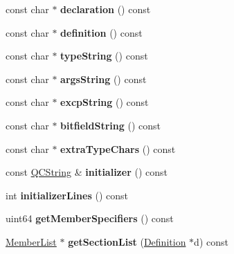 \begin{DoxyCompactItemize}
const char $\ast$ {\bfseries declaration} () const
\item 
\mbox{\label{class_member_def_a112a71f8c5af95c197988060eea13832}} 
const char $\ast$ {\bfseries definition} () const
\item 
\mbox{\label{class_member_def_a3bc37aed3d8749a64ad7007966baef89}} 
const char $\ast$ {\bfseries type\+String} () const
\item 
\mbox{\label{class_member_def_ab16c449b9240d21e79340053ed027887}} 
const char $\ast$ {\bfseries args\+String} () const
\item 
\mbox{\label{class_member_def_ae3722784cb64009073d1519d7168e0a1}} 
const char $\ast$ {\bfseries excp\+String} () const
\item 
\mbox{\label{class_member_def_a8049f8b848eb1c6f53ea6f07fb915c12}} 
const char $\ast$ {\bfseries bitfield\+String} () const
\item 
\mbox{\label{class_member_def_ac77d297cf81238c75c221b7e96e7cc1e}} 
const char $\ast$ {\bfseries extra\+Type\+Chars} () const
\item 
\mbox{\label{class_member_def_a7abeeba1268afd05f3fb506ec12d816d}} 
const \mbox{\hyperlink{class_q_c_string}{Q\+C\+String}} \& {\bfseries initializer} () const
\item 
\mbox{\label{class_member_def_a075682790a5e2f9835316e8803d2faeb}} 
int {\bfseries initializer\+Lines} () const
\item 
\mbox{\label{class_member_def_aef55d782d1eb98391ec53bfe2b803ef6}} 
uint64 {\bfseries get\+Member\+Specifiers} () const
\item 
\mbox{\label{class_member_def_afbb8d03760fd53c0d01ffdae9093d0ca}} 
\mbox{\hyperlink{class_member_list}{Member\+List}} $\ast$ {\bfseries get\+Section\+List} (\mbox{\hyperlink{class_definition}{Definition}} $\ast$d) const
\item 
\mbox{\label{class_member_def_ae23e9fe0b4d70fb9e30219608498ffce}} 

\end{DoxyCompactItemize}
